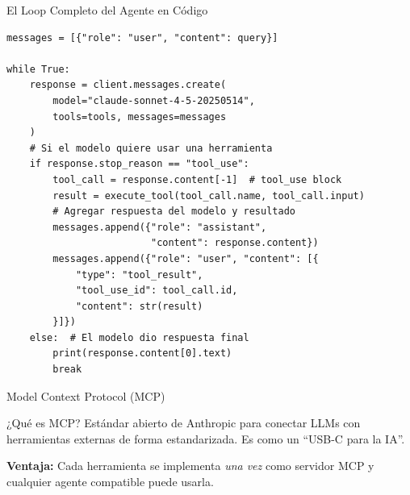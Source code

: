 \documentclass[aspectratio=169]{beamer}
\begin{document}
\begin{frame}[fragile]{El Loop Completo del Agente en Código}
\begin{lstlisting}[style=codestyle]
messages = [{"role": "user", "content": query}]

while True:
    response = client.messages.create(
        model="claude-sonnet-4-5-20250514",
        tools=tools, messages=messages
    )
    # Si el modelo quiere usar una herramienta
    if response.stop_reason == "tool_use":
        tool_call = response.content[-1]  # tool_use block
        result = execute_tool(tool_call.name, tool_call.input)
        # Agregar respuesta del modelo y resultado
        messages.append({"role": "assistant",
                         "content": response.content})
        messages.append({"role": "user", "content": [{
            "type": "tool_result",
            "tool_use_id": tool_call.id,
            "content": str(result)
        }]})
    else:  # El modelo dio respuesta final
        print(response.content[0].text)
        break
\end{lstlisting}
\end{frame}
\begin{frame}{Model Context Protocol (MCP)}
    \begin{block}{¿Qué es MCP?}
        Estándar abierto de Anthropic para conectar LLMs con herramientas externas de forma estandarizada. Es como un ``USB-C para la IA''.
    \end{block}
    
    \centering
    
    \vspace{0.2cm}
    \textbf{Ventaja:} Cada herramienta se implementa \textit{una vez} como servidor MCP y cualquier agente compatible puede usarla.
\end{frame}
\end{document}

